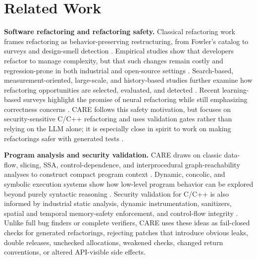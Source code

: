 \providecommand{\SysName}{CARE}

\section{Related Work}
\label{sec:related-work}

\noindent\textbf{Software refactoring and refactoring safety.}
Classical refactoring work frames refactoring as behavior-preserving
restructuring, from Fowler's catalog to surveys and design-smell detection
\cite{fowler2018refactoring,mens2004survey,marinescu2004detection}. Empirical
studies show that developers refactor to manage complexity, but that such
changes remain costly and regression-prone in both industrial and open-source
settings \cite{kim2014empirical,vassallo2019large}. Search-based,
measurement-oriented, large-scale, and history-based studies further examine
how refactoring opportunities are selected, evaluated, and detected
\cite{o2008search,o2016measuring,golubev2021one,tsantalis2018accurate}. Recent
learning-based surveys highlight the promise of neural refactoring while still
emphasizing correctness concerns \cite{nyirongo2024survey}. \SysName{} follows
this safety motivation, but focuses on security-sensitive C/C++ refactoring and
uses validation gates rather than relying on the LLM alone; it is especially
close in spirit to work on making refactorings safer with generated tests
\cite{soares2010making}.

\noindent\textbf{Program analysis and security validation.}
\SysName{} draws on classic data-flow, slicing, SSA, control-dependence, and
interprocedural graph-reachability analyses to construct compact program
context \cite{allen1976program,weiser1984program,cytron1991efficiently,
reps1995precise}. Dynamic, concolic, and symbolic execution systems show how
low-level program behavior can be explored beyond purely syntactic reasoning
\cite{godefroid2005dart,sen2005cute,cadar2008exe,cadar2008klee}. Security
validation for C/C++ is also informed by industrial static analysis, dynamic
instrumentation, sanitizers, spatial and temporal memory-safety enforcement,
and control-flow integrity
\cite{bessey2010few,nethercote2007valgrind,serebryany2012addresssanitizer,
stepanov2015memorysanitizer,nagarakatte2009softbound,nagarakatte2010cets,
duck2018effectivesan,abadi2009control}. Unlike full bug finders or complete
verifiers, \SysName{} uses these ideas as fail-closed checks for generated
refactorings, rejecting patches that introduce obvious leaks, double releases,
unchecked allocations, weakened checks, changed return conventions, or altered
API-visible side effects.

